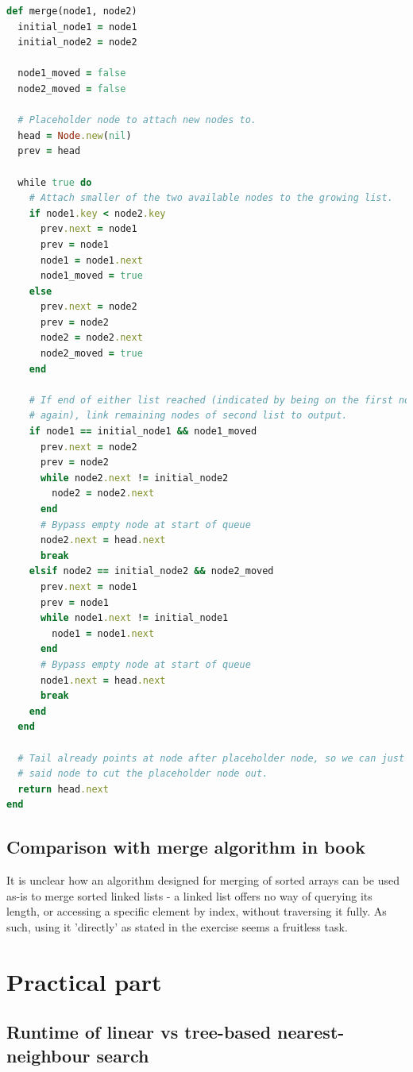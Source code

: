 \documentclass[a4paper]{scrartcl}
\begin{document}
\begin{lstlisting}[language=ruby]
def merge(node1, node2)
  initial_node1 = node1
  initial_node2 = node2

  node1_moved = false
  node2_moved = false

  # Placeholder node to attach new nodes to.
  head = Node.new(nil)
  prev = head

  while true do
    # Attach smaller of the two available nodes to the growing list.
    if node1.key < node2.key
      prev.next = node1
      prev = node1
      node1 = node1.next
      node1_moved = true
    else
      prev.next = node2
      prev = node2
      node2 = node2.next
      node2_moved = true
    end

    # If end of either list reached (indicated by being on the first node
    # again), link remaining nodes of second list to output.
    if node1 == initial_node1 && node1_moved
      prev.next = node2
      prev = node2
      while node2.next != initial_node2
        node2 = node2.next
      end
      # Bypass empty node at start of queue
      node2.next = head.next
      break
    elsif node2 == initial_node2 && node2_moved
      prev.next = node1
      prev = node1
      while node1.next != initial_node1
        node1 = node1.next
      end
      # Bypass empty node at start of queue
      node1.next = head.next
      break
    end
  end

  # Tail already points at node after placeholder node, so we can just return
  # said node to cut the placeholder node out.
  return head.next
end
\end{lstlisting}

\subsection{Comparison with merge algorithm in book}

It is unclear how an algorithm designed for merging of sorted arrays can be
used as-is to merge sorted linked lists - a linked list offers no way of
querying its length, or accessing a specific element by index, without
traversing it fully. As such, using it 'directly' as stated in the exercise
seems a fruitless task.

\section{Practical part}

\subsection{Runtime of linear vs tree-based nearest-neighbour search}
\end{document}
